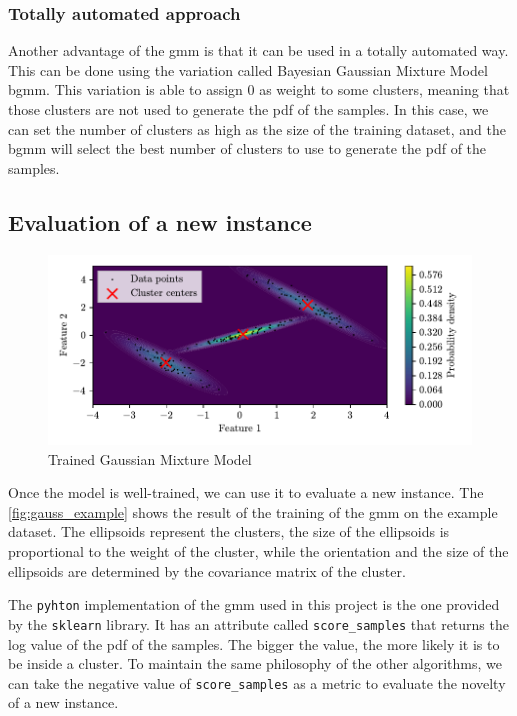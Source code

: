 \subsubsection{Totally automated approach}
\label{sec:gauss_unsupervised}
Another advantage of the \gls{gmm} is that it can be used in a totally automated way. This can be done using the variation called Bayesian Gaussian Mixture Model \gls{bgmm}. This variation is able to assign $0$ as 
weight to some clusters, meaning that those clusters are not used to generate the \gls{pdf} of the samples. In this case, we can set the number of clusters as high as the size of the training dataset, and the \gls{bgmm} will select the best number of clusters to use to generate the \gls{pdf} of the samples. 

\subsection{Evaluation of a new instance}
\label{sec:gauss_eval}
\begin{figure}
    \centering
    \includegraphics{images/Gaussian/Figure_2.pdf}
    \caption{Trained Gaussian Mixture Model}
    \label{fig:gauss_example}
\end{figure}
Once the model is well-trained, we can use it to evaluate a new instance. The \autoref{fig:gauss_example} shows the result of the training of the \gls{gmm} on the example dataset. The ellipsoids represent the clusters, the size of the ellipsoids is proportional to the weight of the cluster, while the orientation and the size of the ellipsoids are determined by the covariance matrix of the cluster. 

The \texttt{pyhton} implementation of the \gls{gmm} used in this project is the one provided by the \texttt{sklearn} library. It has an attribute called \texttt{score\_samples} that returns the log value of the \gls{pdf} of the samples.
The bigger the value, the more likely it is to be inside a cluster. 
To maintain the same philosophy of the other algorithms, we can take the negative value of \texttt{score\_samples} as a metric to evaluate the novelty of a new instance. 


